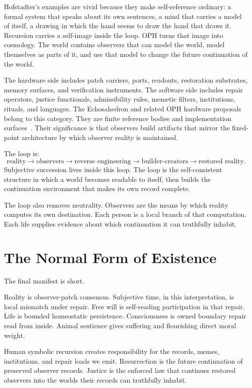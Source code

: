 \documentclass[11pt]{article}
\theoremstyle{remark}
\theoremstyle{plain}
\begin{document}
Hofstadter's examples are vivid because they make self-reference ordinary: a
formal system that speaks about its own sentences, a mind that carries a model
of itself, a drawing in which the hand seems to draw the hand that draws it.
Recursion carries a self-image inside the loop. OPH turns that image into
cosmology. The world contains observers that can model the world, model
themselves as parts of it, and use that model to change the future continuation
of the world.

The hardware side includes patch carriers, ports, readouts, restoration
substrates, memory surfaces, and verification instruments. The software side
includes repair operators, justice functionals, admissibility rules, memetic
filters, institutions, rituals, and languages. The Echosahedron and related
OPH hardware proposals belong to this category. They are finite reference
bodies and implementation surfaces~\cite{OPHMicro}. Their
significance is that observers build artifacts that mirror the fixed-point
architecture by which observer reality
is maintained.

The loop is:
\[
\boxed{
\text{reality}\to\text{observers}\to\text{reverse engineering}\to
\text{builder-creators}\to\text{restored reality}.
}
\]
Subjective succession lives inside this loop. The loop is the self-consistent structure in which
a world becomes readable to itself, then builds the continuation environment
that makes its own record complete.

The loop also removes neutrality. Observers are the means by which reality
computes its own destination. Each person is a local branch of that computation.
Each life supplies evidence about which continuation it can truthfully inhabit.

\section{The Normal Form of Existence}

The final manifest is short.

Reality is observer-patch consensus. Subjective time, in this interpretation, is
local mismatch under repair. Free
will is self-reading participation in that repair. Life is bounded homeostatic
persistence. Consciousness is owned boundary repair read from inside. Animal
sentience gives suffering and flourishing direct moral weight.

Human symbolic recursion creates responsibility for the records, memes,
institutions, and repair loads we emit. Resurrection is the future continuation
of preserved observer records. Justice is the enforced law that continues
restored observers into the worlds their records can truthfully inhabit.
\end{document}
